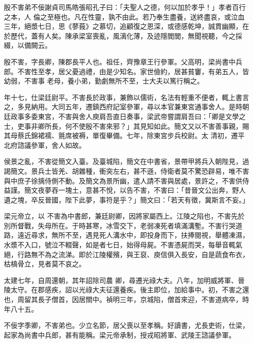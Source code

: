 
\begin{pinyinscope}

 殷不害弟不佞謝貞司馬皓張昭孔子曰：「夫聖人之德，何以加於孝乎！」孝者百行之本，人
 倫之至極也。凡在性靈，孰不由此。若乃奉生盡養，送終盡哀，或泣血三年，絕漿七日，思《蓼莪》之慕切，追顧復之恩深，或德感乾坤，誠貫幽顯，在於歷代，蓋有人矣。陳承梁室喪亂，風漓化薄，及迹隱閻閭，無聞視聽，今之採綴，以備闕云。



 殷不害，字長卿，陳郡長平人也。祖任，齊豫章王行參軍。父高明，梁尚書中兵郎。不害性至孝，居父憂過禮，由是少知名。家世儉約，居甚貧窶，有弟五人，皆幼弱，不害事
 老母，養小弟，勤劇無所不至，士大夫以篤行稱之。



 年十七，仕梁廷尉平。不害長於政事，兼飾以儒術，名法有輕重不便者，輒上書言之，多見納用。大同五年，遷鎮西府記室參軍，尋以本官兼東宮通事舍人。是時朝廷政事多委東宮，不害與舍人庾肩吾直日奏事，梁武帝嘗謂肩吾曰：「卿是文學之士，吏事非卿所長，何不使殷不害來邪？」其見知如此。簡文又以不害善事親，賜其母蔡氏錦裙襦、氈席被褥，單復畢備。七年，除東宮步兵校尉。太
 清初，遷平北府諮議參軍，舍人如故。



 侯景之亂，不害從簡文入臺。及臺城陷，簡文在中書省，景帶甲將兵入朝陛見，過謁簡文。景兵士皆羌、胡雜種，衝突左右，甚不遜，侍衛者莫不驚恐辟易，唯不害與中庶子徐摛侍側不動。及簡文為景所幽，遣人請不害與居處，景許之，不害供侍益謹。簡文夜夢吞一塊土，意甚不悅，以告不害，不害曰：「昔晉文公出奔，野人遺之塊，卒反晉國，陛下此夢，事符是乎？」簡文曰：「若天有徵，冀斯言不妄。」



 梁元帝立，以
 不害為中書郎，兼廷尉卿，因將家屬西上。江陵之陷也，不害先於別所督戰，失母所在。于時甚寒，冰雪交下，老弱凍死者填滿溝塹。不害行哭道路，遠近尋求，無所不至，遇見死人溝水中，即投身而下，扶捧閱視，舉體凍濕，水漿不入口，號泣不輟聲，如是者七日，始得母屍。不害憑屍而哭，每舉音輒氣絕，行路無不為之流涕。即於江陵權殯，與王裒、庾信俱入長安，自是蔬食布衣，枯槁骨立，見者莫不哀之。



 太建七年，自周還朝，其年詔除司農
 卿，尋遷光祿大夫。八年，加明威將軍、晉陵太守。在郡感疾，詔以光祿大夫征還養疾。後主即位，加給事中。初，不害之還也，周留其長子僧首，因居關中。禎明三年，京城陷，僧首來迎，不害道病卒，時年八十五。



 不佞字季卿，不害弟也。少立名節，居父喪以至孝稱。好讀書，尤長吏術，仕梁，起家為尚書中兵郎，甚有能稱。梁元帝承制，授戎昭將軍、武陵王諮議參軍。




\end{pinyinscope}
